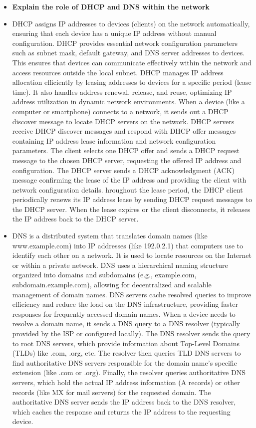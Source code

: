 \documentclass{article}
\begin{document}
\begin{itemize}
  \item \textbf{Explain the role of DHCP and DNS within the network}
  	\item[] DHCP assigns IP addresses to devices (clients) on the network automatically, ensuring that each device has a unique IP address without manual configuration. DHCP provides essential network configuration parameters such as subnet mask, default gateway, and DNS server addresses to devices. This ensures that devices can communicate effectively within the network and access resources outside the local subnet. DHCP manages IP address allocation efficiently by leasing addresses to devices for a specific period (lease time). It also handles address renewal, release, and reuse, optimizing IP address utilization in dynamic network environments. When a device (like a computer or smartphone) connects to a network, it sends out a DHCP discover message to locate DHCP servers on the network. DHCP servers receive DHCP discover messages and respond with DHCP offer messages containing IP address lease information and network configuration parameters. The client selects one DHCP offer and sends a DHCP request message to the chosen DHCP server, requesting the offered IP address and configuration. The DHCP server sends a DHCP acknowledgment (ACK) message confirming the lease of the IP address and providing the client with network configuration details. hroughout the lease period, the DHCP client periodically renews its IP address lease by sending DHCP request messages to the DHCP server. When the lease expires or the client disconnects, it releases the IP address back to the DHCP server.
	\item[] DNS is a distributed system that translates domain names (like www.example.com) into IP addresses (like 192.0.2.1) that computers use to identify each other on a network. It is used to locate resources on the Internet or within a private network. DNS uses a hierarchical naming structure organized into domains and subdomains (e.g., example.com, subdomain.example.com), allowing for decentralized and scalable management of domain names. DNS servers cache resolved queries to improve efficiency and reduce the load on the DNS infrastructure, providing faster responses for frequently accessed domain names. When a device needs to resolve a domain name, it sends a DNS query to a DNS resolver (typically provided by the ISP or configured locally). The DNS resolver sends the query to root DNS servers, which provide information about Top-Level Domains (TLDs) like .com, .org, etc. The resolver then queries TLD DNS servers to find authoritative DNS servers responsible for the domain name's specific extension (like .com or .org). Finally, the resolver queries authoritative DNS servers, which hold the actual IP address information (A records) or other records (like MX for mail servers) for the requested domain. The authoritative DNS server sends the IP address back to the DNS resolver, which caches the response and returns the IP address to the requesting device.
  

\end{itemize}
\end{document}
